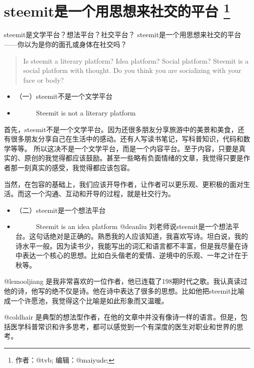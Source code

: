 \documentclass[]{ctexbook}
\providecommand{\tightlist}{%
  \setlength{\itemsep}{0pt}\setlength{\parskip}{0pt}}
\begin{document}
\hypertarget{idea-social}{%
\section[steemit是一个用思想来社交的平台 ]{\texorpdfstring{steemit是一个用思想来社交的平台 \footnote{作者：@tvb; 编辑：@maiyude;}}{steemit是一个用思想来社交的平台 }}\label{idea-social}}

steemit是文学平台？想法平台？社交平台？
steemit是一个用思想来社交的平台------你以为是你的面孔或身体在社交吗？

\begin{quote}
Is steemit a literary platform? Idea platform? Social platform?
Steemit is a social platform with thought.
Do you think you are socializing with your face or body?
\end{quote}

\begin{itemize}
\tightlist
\item
  （一）steemit不是一个文学平台
\item
  　　　Steemit is not a literary platform
\end{itemize}

首先，steemit不是一个文学平台。因为还很多朋友分享旅游中的美景和美食，还有很多朋友分享自己在生活中的感动。还有人写读书笔记，写科普知识，代码和数学等等。
所以这决不是一个文学平台，而是一个内容平台。至于内容，只要是真实的、原创的我觉得都应该鼓励。甚至一些略有负面情绪的文章，我觉得只要是作者那一刻真实的感受，我觉得都应该包容。

当然，在包容的基础上，我们应该开导作者，让作者可以更乐观、更积极的面对生活。而这一个沟通、互动和开导的过程，就是社交行为。

\begin{itemize}
\tightlist
\item
  （二）steemit是一个想法平台
\item
  　　　Steemit is an idea platform
  @deanliu 刘老师说steemit是一个想法平台。这句话绝对是正确的。熟悉我的人应该知道，我喜欢写诗。坦白说，我的诗水平一般。因为读书少，我能写出的词汇和语言都不丰富，但是我尽量在诗中表达一个核心的思想。比如白头偕老的爱情、逆境中的乐观、一年之计在于秋等。
\end{itemize}

@lemooljiang 是我非常喜欢的一位作者，他已连载了198期时代之歌。我认真读过他的诗，他写的绝不仅是诗。他在诗中表达了很多的思想。比如他把steemit比喻成一个许愿池，我觉得这个比喻是如此形象而又温暖。

@coldhair 是典型的想法型作者，在他的文章中并没有像诗一样的语言。但是，包括医学科普常识和许多思考，都可以感觉到一个有深度的医生对职业和世界的思考。
\end{document}
